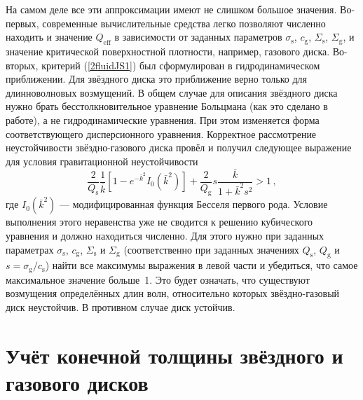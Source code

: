 \documentclass[russian,12pt]{article}
\begin{document}
На самом деле все эти аппроксимации имеют не слишком большое значения. 
Во-первых, современные вычислительные средства легко позволяют численно 
находить и значение $Q_\mathrm{eff}$ в зависимости от заданных параметров 
$\sigma_\mathrm{s}$, $c_\mathrm{g}$, $\Sigma_\mathrm{s}$, 
$\Sigma_\mathrm{g}$, и значение критической поверхностной плотности, 
например, газового диска. Во-вторых, критерий (\ref{2fluidJS1}) был 
сформулирован в гидродинамическом приближении. Для звёздного диска это 
приближение верно только для длинноволновых возмущений. В общем случае для 
описания звёздного диска нужно брать бесстолкновительное уравнение 
Больцмана (как это сделано в работе\citep{Toomre64}), а не гидродинамические 
уравнения. При этом изменяется форма соответствующего дисперсионного 
уравнения. Корректное рассмотрение неустойчивости звёздно-газового диска 
провёл \cite{Rafikov01} и получил следующее выражение для условия 
гравитационной неустойчивости
\begin{equation}
\frac{2}{Q_\mathrm{s}} \frac{1}{\bar{k}} 
\left[1 - e^{-\bar{k}^2} I_0(\bar{k}^2)\right] + 
\frac{2}{Q_\mathrm{g}} s \frac{\bar{k}}{1 + \bar{k}^2 s^2} > 1 \, ,
\end{equation}
где $I_0(\bar{k}^2)$ --- модифицированная функция Бесселя первого рода.
Условие выполнения этого неравенства уже не сводится к решению 
кубического уравнения и должно находиться численно. Для этого нужно 
при заданных параметрах $\sigma_\mathrm{s}$, $c_\mathrm{g}$, 
$\Sigma_\mathrm{s}$ и $\Sigma_\mathrm{g}$ 
(соответственно при заданных значениях $Q_\mathrm{s}$, $Q_\mathrm{g}$ и 
$s = \sigma_\mathrm{g}/c_\mathrm{s}$) найти все максимумы выражения 
в левой части и убедиться, что самое максимальное значение больше~1. 
Это будет означать, что существуют возмущения определённых длин волн, 
относительно которых звёздно-газовый диск неустойчив. В противном случае 
диск устойчив.

\section{Учёт конечной толщины звёздного и газового дисков}
\end{document}
